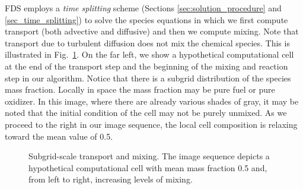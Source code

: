 FDS employs a \emph{time splitting} scheme (Sections \ref{sec:solution_procedure} and \ref{sec_time_splitting}) to solve the species equations in which we first compute transport (both advective and diffusive) and then we compute mixing.  Note that transport due to turbulent diffusion does not mix the chemical species.  This is illustrated in Fig.~\ref{fig_transport_vs_mixing}.  On the far left, we show a hypothetical computational cell at the end of the transport step and the beginning of the mixing and reaction step in our algorithm.  Notice that there is a subgrid distribution of the species mass fraction.  Locally in space the mass fraction may be pure fuel or pure oxidizer.  In this image, where there are already various shades of gray, it may be noted that  the initial condition of the cell may not be purely unmixed.  As we proceed to the right in our image sequence, the local cell composition is relaxing toward the mean value of 0.5. 

\begin{figure}[h]
\begin{center}
\end{center}
\caption{Subgrid-scale transport and mixing. The image sequence depicts a hypothetical computational cell with mean mass fraction 0.5 and, from left to right, increasing levels of mixing.}
\label{fig_transport_vs_mixing}
\end{figure}

